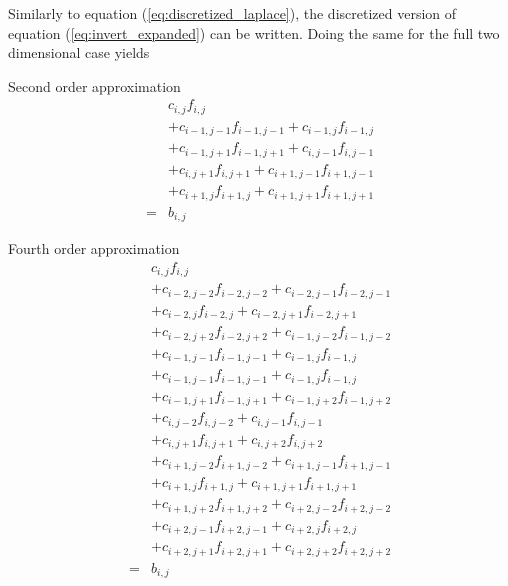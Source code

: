 \documentclass[12pt]{article}
\begin{document}
Similarly to equation (\ref{eq:discretized_laplace}), the discretized version
of equation (\ref{eq:invert_expanded}) can be written. Doing the same for the
full two dimensional case yields\\
%
\begin{minipage}{0.45\textwidth}
Second order approximation
%
\begin{align*}
    \; & c_{i,j} f_{i,j} \\
    &+ c_{i-1,j-1} f_{i-1,j-1} + c_{i-1,j} f_{i-1,j} \\
    &+ c_{i-1,j+1} f_{i-1,j+1} + c_{i,j-1} f_{i,j-1} \\
    &+ c_{i,j+1} f_{i,j+1} + c_{i+1,j-1} f_{i+1,j-1} \\
    &+ c_{i+1,j} f_{i+1,j} + c_{i+1,j+1} f_{i+1,j+1} \\
%
    =& b_{i,j}
\end{align*}
%
\end{minipage}
%
\hspace{1cm}
%
\begin{minipage}{0.45\textwidth}
Fourth order approximation
%
\begin{align*}
    \; & c_{i,j} f_{i,j} \\
    &+ c_{i-2,j-2} f_{i-2,j-2} + c_{i-2,j-1} f_{i-2,j-1} \\
    &+ c_{i-2,j} f_{i-2,j} + c_{i-2,j+1} f_{i-2,j+1} \\
    &+ c_{i-2,j+2} f_{i-2,j+2} + c_{i-1,j-2} f_{i-1,j-2} \\
    &+ c_{i-1,j-1} f_{i-1,j-1} + c_{i-1,j} f_{i-1,j} \\
    &+ c_{i-1,j-1} f_{i-1,j-1} + c_{i-1,j} f_{i-1,j} \\
    &+ c_{i-1,j+1} f_{i-1,j+1} + c_{i-1,j+2} f_{i-1,j+2} \\
    &+ c_{i,j-2} f_{i,j-2} + c_{i,j-1} f_{i,j-1} \\
    &+ c_{i,j+1} f_{i,j+1} + c_{i,j+2} f_{i,j+2} \\
    &+ c_{i+1,j-2} f_{i+1,j-2} + c_{i+1,j-1} f_{i+1,j-1} \\
    &+ c_{i+1,j} f_{i+1,j} + c_{i+1,j+1} f_{i+1,j+1} \\
    &+ c_{i+1,j+2} f_{i+1,j+2} + c_{i+2,j-2} f_{i+2,j-2} \\
    &+ c_{i+2,j-1} f_{i+2,j-1} + c_{i+2,j} f_{i+2,j} \\
    &+ c_{i+2,j+1} f_{i+2,j+1} + c_{i+2,j+2} f_{i+2,j+2} \\
%
    =& b_{i,j}
\end{align*}
%
\end{minipage}
\end{document}
